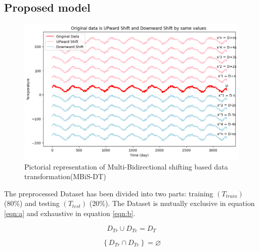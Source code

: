 \documentclass[sn-mathphys,Numbered]{sn-jnl}
\theoremstyle{thmstyleone}
\theoremstyle{thmstyletwo}
\theoremstyle{thmstylethree}
\begin{document}
\subsection{Proposed model}
\begin{figure}[ht!]
    \centering
    \includegraphics[width=1\textwidth, height=0.9\linewidth]{shifted_dataset.png}
    \caption{Pictorial representation of Multi-Bidirectional shifting based data transformation(MBiS-DT)}
    \label{fig:shifted_dataset}
\end{figure}
 The preprocessed Dataset has been divided into two parts: training \((T_{train})\) (80\%) and testing \((T_{test})\) (20\%). The Dataset is mutually exclusive in equation \ref{eqn:a} and exhaustive in equation \ref{eqn:b}.

\begin{equation}
\label{eqn:a}
D_{Tr}\cup D_{Te}=D_{T}
\end{equation}

\begin{equation}
\label{eqn:b}
\left \{ D_{Tr} \cap D_{Te} \right \}=\varnothing 
\end{equation}
\end{document}
